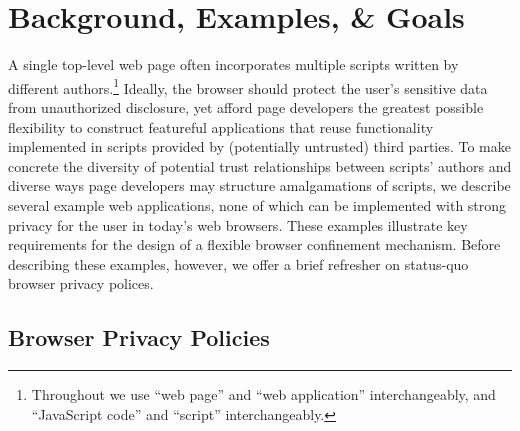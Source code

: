 \section{Background, Examples, \& Goals}

A single top-level web page often incorporates multiple scripts
written by different authors.\footnote{Throughout we use ``web page''
  and ``web application'' interchangeably, and ``JavaScript code'' and
  ``script'' interchangeably.} Ideally, the browser should protect the
user's sensitive data from unauthorized disclosure, yet afford page
developers the greatest possible flexibility to construct %
featureful applications that reuse functionality implemented in
scripts provided by (potentially untrusted) third parties. To make
concrete the diversity of potential trust relationships between
scripts' authors and diverse ways page developers may structure
amalgamations of scripts, we describe several example web
applications, none of which can be implemented with strong privacy for
the user in today's web browsers. These examples illustrate key
requirements for the design of a flexible browser confinement
mechanism. Before describing these examples, however, we offer a brief
refresher on status-quo browser privacy polices.

\subsection{Browser Privacy Policies}
\label{sec:backgd}

